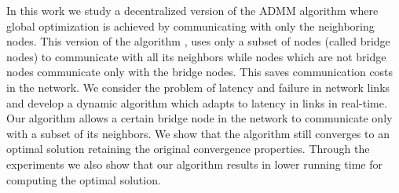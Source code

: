 \documentclass[letterpaper, 10 pt, conference]{ieeeconf}  %
\begin{document}
In this work we study a decentralized version of the ADMM algorithm where global optimization is achieved by communicating with only the neighboring nodes. This version of the algorithm \cite{schizas2008consensus}, uses only a subset of nodes (called bridge nodes) to communicate with all its neighbors while nodes which are not bridge nodes communicate only with the bridge nodes. This saves communication costs in the network. We consider the problem of latency and failure in network links and develop a dynamic algorithm which adapts to latency in links in real-time. Our algorithm allows a certain bridge node in the network to communicate only with a subset of its neighbors. We show that the algorithm still converges to an optimal solution retaining the original convergence properties. Through the experiments we also show that our algorithm results in lower running time for computing the optimal solution. 

\end{document}
